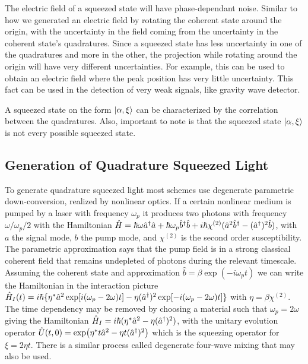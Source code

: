 The electric field of a squeezed state will have phase-dependant noise. Similar to how we generated an electric field by rotating the coherent state around the origin, with the uncertainty in the field coming from the uncertainty in the coherent state's quadratures. Since a squeezed state has less uncertainty in one of the quadratures and more in the other, the projection while rotating around the origin will have very different uncertainties. For example, this can be used to obtain an electric field where the peak position has very little uncertainty. This fact can be used in the detection of very weak signals, like gravity wave detector. 

A squeezed state on the form $\ket{\alpha, \xi}$ can be characterized by the correlation between the quadratures. Also, important to note is that the squeezed state $\ket{\alpha, \xi}$ is not every possible squeezed state. 

\subsection{Generation of Quadrature Squeezed Light}
To generate quadrature squeezed light most schemes use degenerate parametric down-conversion, realized by nonlinear optics. If a certain nonlinear medium is pumped by a laser with frequency $\omega_p$ it produces two photons with frequency $\omega / \omega_p/2$ with the Hamiltonian $\hat{H} = \hbar\omega\hat{a}^\dagger\hat{a} + \hbar\omega_p\hat{b}^\dagger \hat{b} + i\hbar \chi^{(2)} (\hat{a}^2 \hat{b}^\dagger - (\hat{a}^\dagger)^2 \hat{b})$, with $a$ the signal mode, $b$ the pump mode, and $\chi^{(2)}$ is the second order susceptibility. The parametric approximation says that the pump field is in a strong classical coherent field that remains undepleted of photons during the relevant timescale. Assuming the coherent state and approximation $\hat{b} = \beta \exp(-i\omega_p t)$ we can write the Hamiltonian in the interaction picture $\hat{H}_I (t) = i\hbar\{ \eta^* \hat{a}^2 \exp[i(\omega_p - 2\omega)t] - \eta (\hat{a}^\dagger)^2 \exp[-i(\omega_p - 2\omega)t] \}$ with $\eta = \beta \chi^{(2)}$. The time dependency may be removed by choosing a material such that $\omega_p = 2\omega$ giving the Hamiltonian $\hat{H}_I = i\hbar (\eta^* \hat{a}^2 - \eta (\hat{a}^\dagger)^2)$, with the unitary evolution operator $\hat{U}(t,0) = \exp(\eta^* t \hat{a}^2 - \eta t (\hat{a}^\dagger)^2)$ which is the squeezing operator for $\xi = 2\eta t$. There is a similar process called degenerate four-wave mixing that may also be used.

